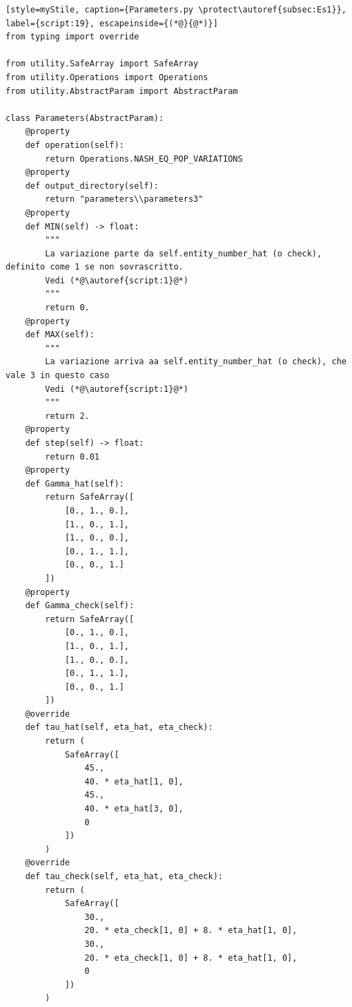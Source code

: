 \begin{lstlisting}[style=myStile, caption={Parameters.py \protect\autoref{subsec:Es1}}, label={script:19}, escapeinside={(*@}{@*)}]
from typing import override

from utility.SafeArray import SafeArray
from utility.Operations import Operations
from utility.AbstractParam import AbstractParam

class Parameters(AbstractParam):
    @property
    def operation(self):
        return Operations.NASH_EQ_POP_VARIATIONS
    @property
    def output_directory(self):
        return "parameters\\parameters3"
    @property
    def MIN(self) -> float:
        """
        La variazione parte da self.entity_number_hat (o check), definito come 1 se non sovrascritto.
        Vedi (*@\autoref{script:1}@*)
        """
        return 0.
    @property
    def MAX(self):
        """
        La variazione arriva aa self.entity_number_hat (o check), che vale 3 in questo caso
        Vedi (*@\autoref{script:1}@*)
        """
        return 2.
    @property
    def step(self) -> float:
        return 0.01
    @property
    def Gamma_hat(self):
        return SafeArray([
            [0., 1., 0.],
            [1., 0., 1.],
            [1., 0., 0.],
            [0., 1., 1.],
            [0., 0., 1.]
        ])
    @property
    def Gamma_check(self):
        return SafeArray([
            [0., 1., 0.],
            [1., 0., 1.],
            [1., 0., 0.],
            [0., 1., 1.],
            [0., 0., 1.]
        ])
    @override
    def tau_hat(self, eta_hat, eta_check):
        return (
            SafeArray([
                45.,
                40. * eta_hat[1, 0],
                45.,
                40. * eta_hat[3, 0],
                0
            ])
        )
    @override
    def tau_check(self, eta_hat, eta_check):
        return (
            SafeArray([
                30.,
                20. * eta_check[1, 0] + 8. * eta_hat[1, 0],
                30.,
                20. * eta_check[1, 0] + 8. * eta_hat[1, 0],
                0
            ])
        )
\end{lstlisting}

